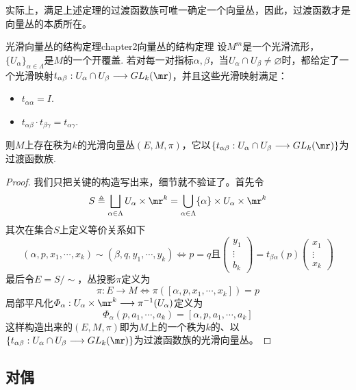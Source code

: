 实际上，满足上述定理的过渡函数族可唯一确定一个向量丛，因此，过渡函数才是向量丛的本质所在。
\begin{mythm}{光滑向量丛的结构定理}{chapter2向量丛的结构定理}
	设$M^{m}$是一个光滑流形，$\{U_{\alpha} \}_{\alpha\in \Lambda}$是$M$的一个开覆盖. 若对每一对指标$\alpha,\beta$，当$U_{\alpha}\cap U_{\beta}\neq\varnothing$时，都给定了一个光滑映射$t_{\alpha\beta}:U_{\alpha}\cap U_{\beta}\longrightarrow GL_{k}(\mr)$，并且这些光滑映射满足：
		\begin{itemize}
		\item[(1)] $t_{\alpha\alpha}=I$. 
		\item[(2)] $t_{\alpha\beta}\cdot t_{\beta\gamma}=t_{\alpha\gamma}$. 
	\end{itemize}
则$M$上存在秩为$k$的光滑向量丛$(E,M,\pi)$，它以$\{t_{\alpha\beta}:U_{\alpha}\cap U_{\beta}\longrightarrow GL_{k}(\mr) \}$为过渡函数族.
\end{mythm}
\begin{proof}
	我们只把关键的构造写出来，细节就不验证了。首先令
	\[
	S\triangleq \bigsqcup_{\alpha\in \Lambda} U_{\alpha}\times \mr^{k}=\bigcup_{\alpha\in \Lambda}\{ \alpha\}\times U_{\alpha}\times \mr^{k}
	\]
	其次在集合$S$上定义等价关系如下
	\[
	(\alpha,p,x_{1},\cdots,x_{k})\sim (\beta,q,y_{1},\cdots,y_{k})\Leftrightarrow p=q\text{且}
	\left( \begin{array}{ccc}{y_{1}} \\ {\vdots}  \\ {b_{k}} \end{array}\right)=t_{\beta\alpha}(p) \left( \begin{array}{ccc}{x_{1}} \\ {\vdots}  \\ {x_{k}} \end{array}\right)
	\]
	最后令$E=S/\sim$，丛投影$\pi$定义为
	\[\pi:E\longrightarrow M\Leftrightarrow\pi([\alpha,p,x_{1},\cdots,x_{k}])=p
	\] 
	局部平凡化$\varPhi_{\alpha}:U_{\alpha}\times \mr^{k}\longrightarrow \pi^{-1}(U_{\alpha})$定义为
	\[
	\varPhi_{\alpha}(p,a_{1},\cdots,a_{k})=[\alpha,p,a_{1},\cdots,a_{k}]
	\]
	这样构造出来的$(E,M,\pi)$即为$M$上的一个秩为$k$的、以$\{t_{\alpha\beta}:U_{\alpha}\cap U_{\beta}\longrightarrow GL_{k}(\mr) \}$为过渡函数族的光滑向量丛。
\end{proof}







\subsection{对偶}

